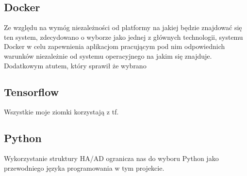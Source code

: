 \subsection{Docker}
Ze względu na wymóg niezależności od platformy na jakiej będzie znajdować się ten system, zdecydowano o wyborze jako jednej z głównych technologii, systemu Docker w celu zapewnienia aplikacjom pracującym pod nim odpowiednich warunków niezależnie od systemu operacyjnego na jakim się znajduje. Dodatkowym atutem, który sprawił że wybrano 

\subsection{Tensorflow}
Wszystkie moje ziomki korzystają z tf.

\subsection{Python}
Wykorzystanie struktury HA/AD ogranicza nas do wyboru Python jako przewodniego języka programowania w tym projekcie.
